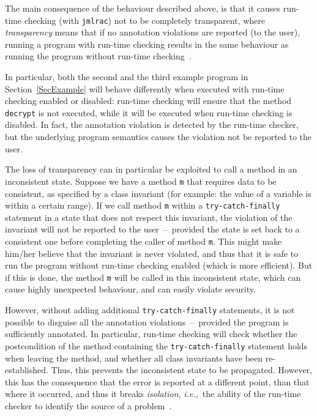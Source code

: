 \documentclass[]{llncs}
\begin{document}
The main consequence of the behaviour described above, is that it
causes run-time checking (with \texttt{jmlrac}) not to be completely
transparent, where \emph{transparency} means that if no annotation
violations are reported (to the user), running a program with run-time
checking results in the same behaviour as running the program without
run-time checking~\cite{BurdyCCEKLLP03}.

In particular, both the second and the third example program in
Section~\ref{SecExample} will behave differently when executed with
run-time checking enabled or disabled: run-time checking will ensure
that the method \texttt{decrypt} is not executed, while it will be
executed when run-time checking is disabled. In fact, the annotation
violation is detected by the run-time checker, but the underlying
program semantics causes the violation not be reported to the user.

The loss of transparency can in particular be exploited to call a
method in an inconsistent state. Suppose we have a method \texttt{m}
that requires data to be consistent, as specified by a class invariant
(for example: the value of a variable is within a certain range). If
we call method \texttt{m} within a \texttt{try-catch-finally}
statement in a state that does not respect this invariant, the
violation of the invariant will not be reported to the
user~--~provided the state is set back to a consistent one before
completing the caller of method \texttt{m}.  This might make him/her
believe that the invariant is never violated, and thus that it is safe
to run the program without run-time checking enabled (which is more
efficient). But if this is done, the method
\texttt{m} will be called in this inconsistent state, which can cause
highly unexpected behaviour, and can easily violate security.

However, without adding additional \texttt{try-catch-finally}
statements, it is not possible to disguise all the annotation
violations~--~provided the program is sufficiently annotated. In
particular, run-time checking will check whether the postcondition of
the method containing the \texttt{try-catch-finally} statement holds
when leaving the method, and whether all class invariants have been
re-established. Thus, this prevents the inconsistent state to be
propagated. However, this has the consequence that the error is
reported at a different point, than that where it occurred, and thus
it breaks \emph{isolation}, \emph{i.e.,}\ the ability of the run-time
checker to identify the source of a problem~\cite{BurdyCCEKLLP03}.
\end{document}
